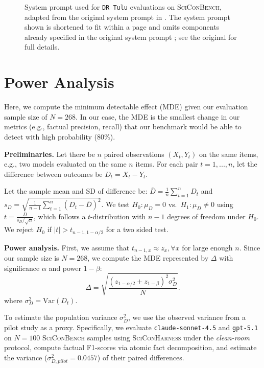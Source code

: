 \documentclass{article}
\newcommand{\xhdr}[1]{%
  \noindent\textbf{#1.}
}
\begin{document}
\begin{figure}[t]
\begin{small}
\caption{System prompt used for \texttt{DR Tulu} evaluations on \textsc{SciConBench}, adapted from the original system prompt in \cite{shao2025drtulureinforcementlearning}. The system prompt shown is shortened to fit within a page and omits components already specified in the original system prompt \cite{shao2025drtulureinforcementlearning}; see the original for full details.}
\label{fig:dr-tulu-instruction-prompt}
\end{small}
\end{figure}



\clearpage

\section{Power Analysis}\label{appendix:power-analysis}
Here, we compute the minimum detectable effect (MDE) given our evaluation sample size of $N=268$. In our case, the MDE is the smallest change in our metrics (e.g., factual precision, recall) that our benchmark would be able to detect with high probability (80\%). 

\xhdr{Preliminaries} Let there be $n$ paired observations $(X_t, Y_t)$ on the same items, e.g., two models evaluated on the same $n$ items. For each pair $t = 1, ..., n$, let the difference between outcomes be $D_t = X_t - Y_t$. 

Let the sample mean and SD of difference be: $\bar D = \frac{1}{n} \sum_{t=1}^n D_t$ and $s_D = \sqrt{ \frac{1}{n-1} \sum_{t=1}^n (D_t - \bar D)^2 }.$
We test $H_0: \mu_D = 0$ vs.\ $H_1: \mu_D \neq 0$ using $t = \frac{\bar D}{s_D / \sqrt{n}}$, which follows a $t$-distribution with $n-1$ degrees of freedom under $H_0$. We reject $H_0$ if $|t| > t_{n-1,1-\alpha/2}$ for a two sided test.

\xhdr{Power analysis} First, we assume that $t_{n-1,x} \approx z_{x}, \forall x$  for large enough $n$. Since our sample size is $N=268$, we compute the MDE represented by $\Delta$ with significance $\alpha$ and power $1-\beta$:
\[
\Delta = \sqrt{\frac{(z_{1-\alpha/2} + z_{1-\beta})^2 \sigma_D^2}{N}}.
\]
where $\sigma_D^2 = \mathrm{Var}(D_t)$.

To estimate the population variance $\sigma_D^2$, we use the observed variance from a pilot study as a proxy. Specifically, we evaluate \texttt{claude-sonnet-4.5} and \texttt{gpt-5.1} on $N=100$ \textsc{SciConBench} samples using \textsc{SciConHarness} under the \textit{clean-room} protocol, compute factual F1-scores via atomic fact decomposition, and estimate the variance ($\sigma_{D, pilot}^2=0.0457$) of their paired differences. 
\end{document}
